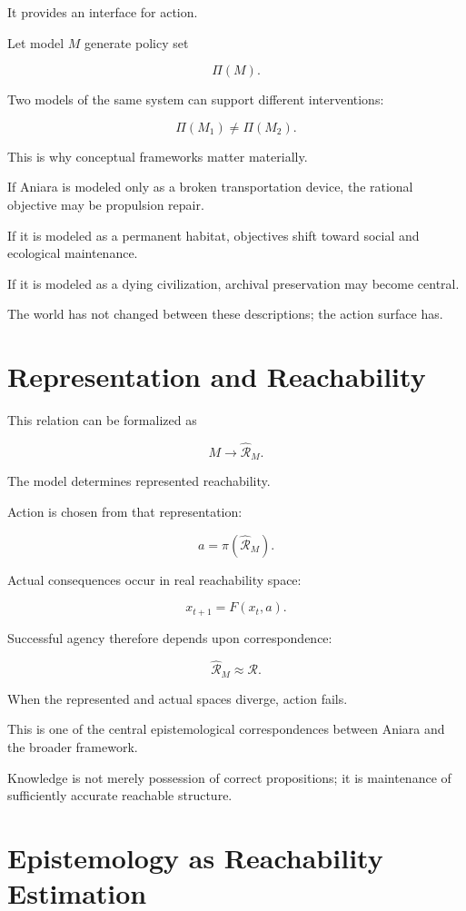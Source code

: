 \documentclass[11pt,oneside]{book}
\theoremstyle{definition}
\theoremstyle{remark}
\newcommand{\R}{\mathcal{R}}
\begin{document}
It provides an interface for action.

Let model \(M\) generate policy set

\[
\Pi(M).
\]

Two models of the same system can support different interventions:

\[
\Pi(M_1)\neq\Pi(M_2).
\]

This is why conceptual frameworks matter materially.

If Aniara is modeled only as a broken transportation device, the rational objective may be propulsion repair.

If it is modeled as a permanent habitat, objectives shift toward social and ecological maintenance.

If it is modeled as a dying civilization, archival preservation may become central.

The world has not changed between these descriptions; the action surface has.

\section{Representation and Reachability}

This relation can be formalized as

\[
M
\rightarrow
\widehat{\R}_M.
\]

The model determines represented reachability.

Action is chosen from that representation:

\[
a
=
\pi(\widehat{\R}_M).
\]

Actual consequences occur in real reachability space:

\[
x_{t+1}
=
F(x_t,a).
\]

Successful agency therefore depends upon correspondence:

\[
\widehat{\R}_M
\approx
\R.
\]

When the represented and actual spaces diverge, action fails.

This is one of the central epistemological correspondences between Aniara and the broader framework.

Knowledge is not merely possession of correct propositions; it is maintenance of sufficiently accurate reachable structure.

\section{Epistemology as Reachability Estimation}
\end{document}
